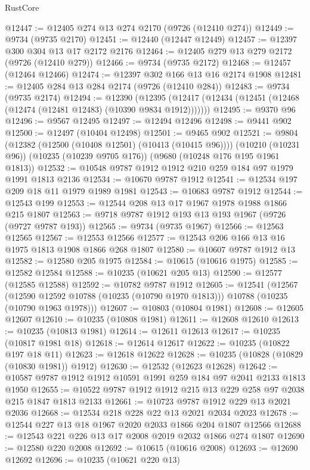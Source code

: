 \begin{lexlean}{RustCore}
\begin{coremodule}
@12447 := @12405 @274 @13 @274 @2170 (@9726 (@12410 @274))
@12449 := @9734 (@9735 @2170)
@12451 := @12440 (@12447 @12449)
@12457 := @12397 @300 @304 @13 @17 @2172 @2176
@12464 := @12405 @279 @13 @279 @2172 (@9726 (@12410 @279))
@12466 := @9734 (@9735 @2172)
@12468 := @12457 (@12464 @12466)
@12474 := @12397 @302 @166 @13 @16 @2174 @1908
@12481 := @12405 @284 @13 @284 @2174 (@9726 (@12410 @284))
@12483 := @9734 (@9735 @2174)
@12494 := @12390
    (@12395 (@12417 (@12434 (@12451 (@12468 (@12474 (@12481 @12483) (@10390 @9834 @1912)))))))
@12495 := @9370 @96
@12496 := @9567 @12495
@12497 := @12494 @12496
@12498 := @9441 @902
@12500 := @12497 (@10404 @12498)
@12501 := @9465 @902
@12521 := @9804
    (@12382 (@12500 (@10408 @12501) (@10413 (@10415 @96))))
    (@10210 (@10231 @96))
    (@10235 (@10239 @9705 @176))
    (@9680 (@10248 @176 @195 @1961 @1813))
@12532 := @10548 @9787 @1912 @1912 @210 @259 @184 @97 @1979 @1991 @1813 @2136
@12534 := @10670 @9787 @1912
@12541 := @12534 @197 @209 @18 @11 @1979 @1989 @1981
@12543 := @10683 @9787 @1912
@12544 := @12543 @199
@12553 := @12544 @208 @13 @17 @1967 @1978 @1988 @1866 @215 @1807
@12563 := @9718 @9787 @1912 @193 @13 @193 @1967 (@9726 (@9727 @9787 @193))
@12565 := @9734 (@9735 @1967)
@12566 := @12563 @12565
@12567 := @12553 @12566
@12577 := @12543 @206 @166 @13 @16 @1975 @1813 @1908 @1866 @268 @1807
@12580 := @10607 @9787 @1912 @13
@12582 := @12580 @205 @1975
@12584 := @10615 (@10616 @1975)
@12585 := @12582 @12584
@12588 := @10235 (@10621 @205 @13)
@12590 := @12577 (@12585 @12588)
@12592 := @10782 @9787 @1912
@12605 := @12541
    (@12567
      (@12590 @12592 @10788 (@10235 (@10790 @1970 @1813)))
      @10788
      (@10235 (@10790 @1963 @1978)))
@12607 := @10803 (@10804 @1981)
@12608 := @12605 @12607
@12610 := @10235 (@10808 @1981)
@12611 := @12608 @12610
@12613 := @10235 (@10813 @1981)
@12614 := @12611 @12613
@12617 := @10235 (@10817 @1981 @18)
@12618 := @12614 @12617
@12622 := @10235 (@10822 @197 @18 @11)
@12623 := @12618 @12622
@12628 := @10235 (@10828 (@10829 (@10830 @1981)) @1912)
@12630 := @12532 (@12623 @12628)
@12642 := @10587 @9787 @1912 @1912 @10591 @1991 @259 @184 @97 @2041 @2133 @1813 @1950
@12655 := @10522 @9787 @1912 @1912 @215 @13 @229 @258 @97 @2038 @215 @1847 @1813 @2133
@12661 := @10723 @9787 @1912 @229 @13 @2021 @2036
@12668 := @12534 @218 @228 @22 @13 @2021 @2034 @2023
@12678 := @12544 @227 @13 @18 @1967 @2020 @2033 @1866 @204 @1807 @12566
@12688 := @12543 @221 @226 @13 @17 @2008 @2019 @2032 @1866 @274 @1807
@12690 := @12580 @220 @2008
@12692 := @10615 (@10616 @2008)
@12693 := @12690 @12692
@12696 := @10235 (@10621 @220 @13)

\end{coremodule}
\end{lexlean}
